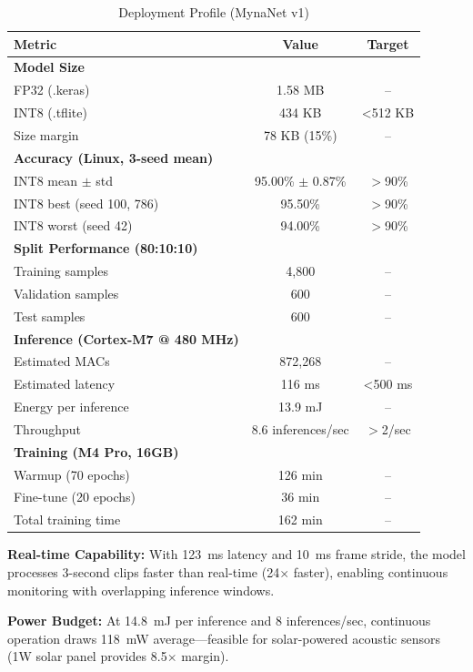 \documentclass[conference]{IEEEtran}
\begin{document}
\begin{table}[h]
\centering
\caption{Deployment Profile (MynaNet v1)}
\label{tab:deployment}
\begin{tabular}{lcc}
\toprule
\textbf{Metric} & \textbf{Value} & \textbf{Target} \\
\midrule
\textbf{Model Size} & & \\
\quad FP32 (.keras) & 1.58 MB & -- \\
\quad INT8 (.tflite) & 434 KB & <512 KB \\
\quad Size margin & 78 KB (15\%) & -- \\
\midrule
\textbf{Accuracy (Linux, 3-seed mean)} & & \\
\quad INT8 mean $\pm$ std & 95.00\% $\pm$ 0.87\% & $>$90\% \\
\quad INT8 best (seed 100, 786) & 95.50\% & $>$90\% \\
\quad INT8 worst (seed 42) & 94.00\% & $>$90\% \\
\midrule
\textbf{Split Performance (80:10:10)} & & \\
\quad Training samples & 4,800 & -- \\
\quad Validation samples & 600 & -- \\
\quad Test samples & 600 & -- \\
\midrule
\textbf{Inference (Cortex-M7 @ 480 MHz)} & & \\
\quad Estimated MACs & 872,268 & -- \\
\quad Estimated latency & 116 ms & <500 ms \\
\quad Energy per inference & 13.9 mJ & -- \\
\quad Throughput & 8.6 inferences/sec & $>$2/sec \\
\midrule
\textbf{Training (M4 Pro, 16GB)} & & \\
\quad Warmup (70 epochs) & 126 min & -- \\
\quad Fine-tune (20 epochs) & 36 min & -- \\
\quad Total training time & 162 min & -- \\
\bottomrule
\end{tabular}
\end{table}

\noindent\textbf{Real-time Capability:} With 123~ms latency and 10~ms frame stride, the model processes 3-second clips faster than real-time (24$\times$ faster), enabling continuous monitoring with overlapping inference windows.

\noindent\textbf{Power Budget:} At 14.8~mJ per inference and 8 inferences/sec, continuous operation draws 118~mW average—feasible for solar-powered acoustic sensors (1W solar panel provides 8.5$\times$ margin).
\end{document}
